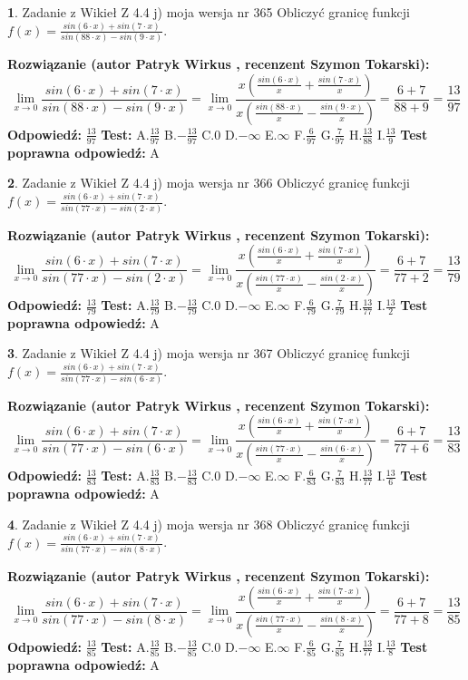 \documentclass[12pt, a4paper]{article}
\theoremstyle{definition} %
\newtheorem{zad}{}
\newcommand{\zadStart}[1]{\begin{zad}#1\newline}
\newcommand{\zadStop}{\end{zad}}
\newcommand{\rozwStart}[2]{\noindent \textbf{Rozwiązanie (autor #1 , recenzent #2): }\newline}
\newcommand{\rozwStop}{\newline}
\newcommand{\odpStart}{\noindent \textbf{Odpowiedź:}\newline}
\newcommand{\odpStop}{\newline}
\newcommand{\testStart}{\noindent \textbf{Test:}\newline}
\newcommand{\testStop}{\newline}
\newcommand{\kluczStart}{\noindent \textbf{Test poprawna odpowiedź:}\newline}
\newcommand{\kluczStop}{\newline}
\begin{document}
\zadStart{Zadanie z Wikieł Z 4.4 j) moja wersja nr 365}
Obliczyć granicę funkcji $f(x)=\frac{sin(6\cdot x) +sin(7\cdot x)}{sin(88\cdot x) -sin(9\cdot x)}$.
\zadStop
\rozwStart{Patryk Wirkus}{Szymon Tokarski}
$$\lim\limits_{x\to 0}\frac{sin(6\cdot x) +sin(7\cdot x)}{sin(88\cdot x) -sin(9\cdot x)}=\lim\limits_{x\to 0}\frac{x(\frac{sin(6\cdot x)}{x}+\frac{sin(7\cdot x)}{x})}{x(\frac{sin(88\cdot x)}{x}-\frac{sin(9\cdot x)}{x})}=\frac{6+7}{88+9} = \frac{13}{97}$$
\rozwStop
\odpStart
$\frac{13}{97}$
\odpStop
\testStart
A.$\frac{13}{97}$
B.$-\frac{13}{97}$
C.$0$
D.$-\infty$
E.$\infty$
F.$\frac{6}{97}$
G.$\frac{7}{97}$
H.$\frac{13}{88}$
I.$\frac{13}{9}$
\testStop
\kluczStart
A
\kluczStop



\zadStart{Zadanie z Wikieł Z 4.4 j) moja wersja nr 366}
Obliczyć granicę funkcji $f(x)=\frac{sin(6\cdot x) +sin(7\cdot x)}{sin(77\cdot x) -sin(2\cdot x)}$.
\zadStop
\rozwStart{Patryk Wirkus}{Szymon Tokarski}
$$\lim\limits_{x\to 0}\frac{sin(6\cdot x) +sin(7\cdot x)}{sin(77\cdot x) -sin(2\cdot x)}=\lim\limits_{x\to 0}\frac{x(\frac{sin(6\cdot x)}{x}+\frac{sin(7\cdot x)}{x})}{x(\frac{sin(77\cdot x)}{x}-\frac{sin(2\cdot x)}{x})}=\frac{6+7}{77+2} = \frac{13}{79}$$
\rozwStop
\odpStart
$\frac{13}{79}$
\odpStop
\testStart
A.$\frac{13}{79}$
B.$-\frac{13}{79}$
C.$0$
D.$-\infty$
E.$\infty$
F.$\frac{6}{79}$
G.$\frac{7}{79}$
H.$\frac{13}{77}$
I.$\frac{13}{2}$
\testStop
\kluczStart
A
\kluczStop



\zadStart{Zadanie z Wikieł Z 4.4 j) moja wersja nr 367}
Obliczyć granicę funkcji $f(x)=\frac{sin(6\cdot x) +sin(7\cdot x)}{sin(77\cdot x) -sin(6\cdot x)}$.
\zadStop
\rozwStart{Patryk Wirkus}{Szymon Tokarski}
$$\lim\limits_{x\to 0}\frac{sin(6\cdot x) +sin(7\cdot x)}{sin(77\cdot x) -sin(6\cdot x)}=\lim\limits_{x\to 0}\frac{x(\frac{sin(6\cdot x)}{x}+\frac{sin(7\cdot x)}{x})}{x(\frac{sin(77\cdot x)}{x}-\frac{sin(6\cdot x)}{x})}=\frac{6+7}{77+6} = \frac{13}{83}$$
\rozwStop
\odpStart
$\frac{13}{83}$
\odpStop
\testStart
A.$\frac{13}{83}$
B.$-\frac{13}{83}$
C.$0$
D.$-\infty$
E.$\infty$
F.$\frac{6}{83}$
G.$\frac{7}{83}$
H.$\frac{13}{77}$
I.$\frac{13}{6}$
\testStop
\kluczStart
A
\kluczStop



\zadStart{Zadanie z Wikieł Z 4.4 j) moja wersja nr 368}
Obliczyć granicę funkcji $f(x)=\frac{sin(6\cdot x) +sin(7\cdot x)}{sin(77\cdot x) -sin(8\cdot x)}$.
\zadStop
\rozwStart{Patryk Wirkus}{Szymon Tokarski}
$$\lim\limits_{x\to 0}\frac{sin(6\cdot x) +sin(7\cdot x)}{sin(77\cdot x) -sin(8\cdot x)}=\lim\limits_{x\to 0}\frac{x(\frac{sin(6\cdot x)}{x}+\frac{sin(7\cdot x)}{x})}{x(\frac{sin(77\cdot x)}{x}-\frac{sin(8\cdot x)}{x})}=\frac{6+7}{77+8} = \frac{13}{85}$$
\rozwStop
\odpStart
$\frac{13}{85}$
\odpStop
\testStart
A.$\frac{13}{85}$
B.$-\frac{13}{85}$
C.$0$
D.$-\infty$
E.$\infty$
F.$\frac{6}{85}$
G.$\frac{7}{85}$
H.$\frac{13}{77}$
I.$\frac{13}{8}$
\testStop
\kluczStart
A
\kluczStop
\end{document}
